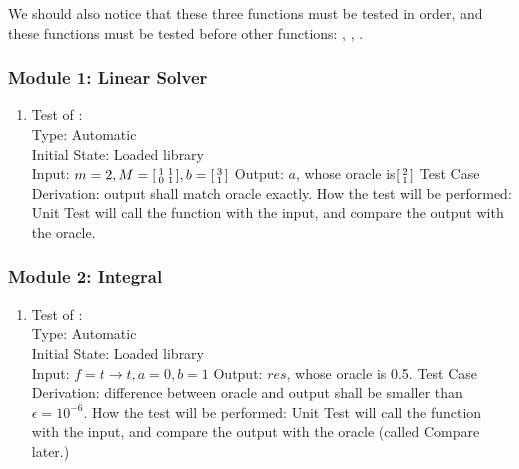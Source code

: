 \documentclass[12pt, titlepage]{article}
\begin{document}
We should also notice that these three functions must be tested in order, and these functions must be tested before other functions: , , .

\subsubsection{Module 1: Linear Solver}
\begin{enumerate}
	\item Test of :\\
	
	Type: Automatic\\
	Initial State: Loaded library\\
	Input: $m=2, M=\begin{bsmallmatrix}
	1 & 1\\0 & 1
	\end{bsmallmatrix}, b=\begin{bsmallmatrix}
	3\\1
	\end{bsmallmatrix}$
	Output: $a$, whose oracle is$\begin{bsmallmatrix}
	2\\1
	\end{bsmallmatrix}$
	Test Case Derivation: output shall match oracle exactly.
	How the test will be performed: Unit Test will call the function with the input, and compare the output with the oracle. 
\end{enumerate}

\subsubsection{Module 2: Integral}
\begin{enumerate}
	\item Test of :\\
	
	Type: Automatic\\
	Initial State: Loaded library\\
	Input: $f=t\rightarrow t, a=0, b=1$
	Output: $\textit{res}$, whose oracle is 0.5.
	Test Case Derivation: difference between oracle and output shall be smaller than $\epsilon=10^{-6}$.
	How the test will be performed: Unit Test will call the function with the input, and compare the output with the oracle (called Compare later.) 
\end{enumerate}
\end{document}
